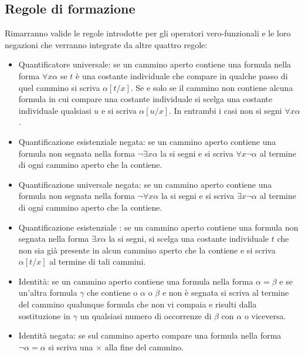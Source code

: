 \subsection{Regole di formazione}
Rimarranno valide le regole introdotte per gli operatori vero-funzionali e le loro negazioni che verranno integrate da altre quattro regole:
\begin{itemize}
\item Quantificatore universale: se un cammino aperto contiene una formula nella forma $\forall x\alpha$ se $t$ \`e una costante individuale che compare in qualche passo di quel cammino si scriva $\alpha[t/x]
$. Se e solo se il cammino non contiene alcuna formula in cui compare una costante individuale si scelga una costante individuale qualsiasi $u$ e si scriva $\alpha[u/x]$. In entrambi i casi non si segni $\forall 
x\alpha$.
\item Quantificazione esistenziale negata: se un cammino aperto contiene una formula non segnata nella forma $\neg\exists x\alpha$ la si segni e si scriva $\forall x\neg\alpha$ al termine di ogni cammino 
aperto che la contiene.
\item Quantificazione universale negata: se un cammino aperto contiene una formula non segnata nella forma $\neg\forall x \alpha$ la si segni e si scriva $\exists x\neg\alpha$ al termine di ogni cammino 
aperto che la contiene. 
\item Quantificazione esistenziale : se un cammino aperto contiene una formula non segnata nella forma $\exists x\alpha$ la si segni, si scelga una costante individuale $t$ che non sia gi\`a presente in alcun 
cammino aperto che la contiene e si scriva $\alpha[t/x]$ al termine di tali cammini.
\item Identit\`a: se un cammino aperto contiene una formula nella forma $\alpha=\beta$ e se un'altra formula $\gamma$ che contiene o $\alpha$ o $\beta$ e non \`e segnata si scriva al termine del cammino 
qualunque formula che non vi compaia e risulti dalla sostituzione in $\gamma$ un qualsiasi numero di occorrenze di $\beta$ con $\alpha$ o viceversa.
\item Identit\`a negata: se sul cammino aperto compare una formula nella forma $\neg\alpha=\alpha$ si scriva una $\times$ alla fine del cammino. 
\end{itemize}
